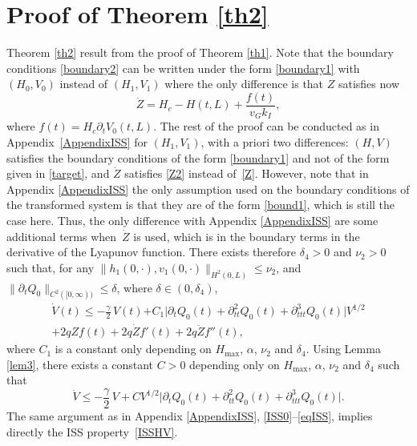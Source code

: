 \documentclass[JEP,XML,SOM,Unicode]{cedram}
\theoremstyle{definition}
\begin{document}
\section{Proof of Theorem \ref{th2}}
\label{ISS2}
Theorem \ref{th2} result from the proof of Theorem \ref{th1}. Note that the boundary conditions \eqref{boundary2} can be written under the form \eqref{boundary1} with $(H_{0},V_{0})$ instead of $(H_{1},V_{1})$
where the only difference is that $Z$ satisfies now
\begin{equation}
\dot Z=H_{c}-H(t,L)+\frac{f(t)}{v_{G}k_{I}},
\label{Z2}
\end{equation}
where $f(t)=H_{c}\partial_{t}V_{0}(t,L)$.
The rest of the proof can be conducted as in Appendix~\ref{AppendixISS} for $(H_{1},V_{1})$,
with a priori two differences: $(H,V)$ satisfies the boundary conditions of the form \eqref{boundary1} and not of the form given in \eqref{target},
and $\dot Z$ satisfies \eqref{Z2} instead of~\eqref{Z}. However,
note that in Appendix \ref{AppendixISS} the only assumption used on the boundary conditions of the transformed system is that they are of the form \eqref{bound1},
which is still the case here.
Thus,
the only difference with Appendix \ref{AppendixISS} are
some addi\-tional terms when~$\dot Z$ is used, which is in the boundary terms in the derivative of the Lyapunov function. There exists therefore $\delta_{4}>0$ and $\nu_{2}>0$ such that{, for any $\lVert h_{1}(0,\cdot),v_{1}(0,\cdot)\rVert_{H^{2}(0,L)}\leq \nu_{2}$,
and $\lVert\partial_{t}Q_{0}\rVert_{C^{2}([0,\infty))}\leq \delta$, where $\delta\in(0,\delta_{4})$,}
\begin{multline*}
\dot V(t)\leq -\frac{\gamma}{2}\,V(t)
{+C_{1}\bigl|\partial_{t}Q_{0}(t)+\partial_{tt}^{2}Q_{0}(t)+\partial_{ttt}^{3}Q_{0}(t)\bigr|V^{1/2}}\\
+2qZf(t)+2q\dot Zf'(t)+2q\ddot Zf''(t),
\end{multline*}
where $C_{1}$ is a constant only depending on $H_{\max}$, $\alpha$, $\nu_{2}$ and $\delta_{4}$. Using Lemma \ref{lem3},
there exists a constant $C>0$ depending only on $H_{\max}$, $\alpha$, $\nu_{2}$ and $\delta_{4}$ such that
\begin{equation*}
\dot V\leq -\frac{\gamma}{2}\,V+CV^{1/2}\bigl|\partial_{t}Q_{0}(t)+\partial_{tt}^{2}Q_{0}(t)+\partial_{ttt}^{3}Q_{0}(t)\bigr|.
\end{equation*}
The same argument as in Appendix \ref{AppendixISS}, \eqref{ISS0}--\eqref{eqISS}, implies directly the ISS property~\eqref{ISSHV}.
\end{document}
